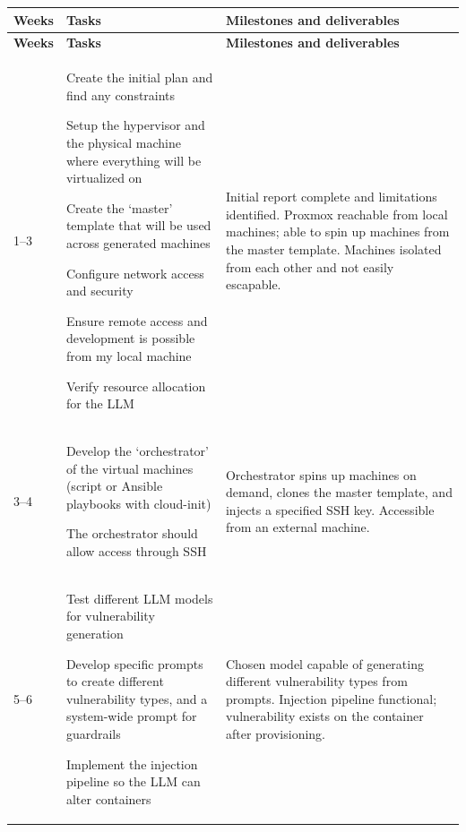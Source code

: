 \documentclass[serif,oneside,single,parskip,raggedright,numeric]{qproposal}
\begin{document}
\begin{longtable}{C{1.3cm} P{6.2cm} P{6.2cm}}
  \toprule
  \textbf{Weeks} & \textbf{Tasks} & \textbf{Milestones and deliverables} \\
  \midrule
  \endfirsthead
  \toprule
  \textbf{Weeks} & \textbf{Tasks} & \textbf{Milestones and deliverables} \\
  \midrule
  \endhead
  \bottomrule
  \endfoot

  1--3 &
  \begin{cellist}
    \item Create the initial plan and find any constraints
    \item Setup the hypervisor and the physical machine where everything will be virtualized on
    \item Create the `master' template that will be used across generated machines
    \item Configure network access and security
    \item Ensure remote access and development is possible from my local machine
    \item Verify resource allocation for the LLM
  \end{cellist}
  &
  Initial report complete and limitations identified. Proxmox reachable from local machines; able to spin up machines from the master template. Machines isolated from each other and not easily escapable.
  \\[4pt]

  3--4 &
  \begin{cellist}
    \item Develop the `orchestrator' of the virtual machines (script or Ansible playbooks with cloud-init)
    \item The orchestrator should allow access through SSH
  \end{cellist}
  &
  Orchestrator spins up machines on demand, clones the master template, and injects a specified SSH key. Accessible from an external machine.
  \\[4pt]

  5--6 &
  \begin{cellist}
    \item Test different LLM models for vulnerability generation
    \item Develop specific prompts to create different vulnerability types, and a system-wide prompt for guardrails
    \item Implement the injection pipeline so the LLM can alter containers
  \end{cellist}
  &
  Chosen model capable of generating different vulnerability types from prompts. Injection pipeline functional; vulnerability exists on the container after provisioning.
  \\[4pt]


\end{longtable}
\end{document}
